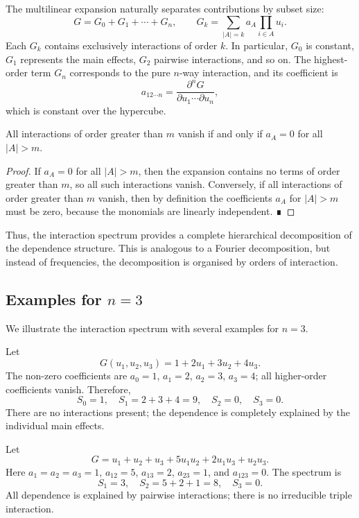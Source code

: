 The multilinear expansion naturally separates contributions by subset size:
\[
G = G_0 + G_1 + \cdots + G_n,\qquad G_k = \sum_{|A|=k} a_A \prod_{i\in A} u_i.
\]
Each \(G_k\) contains exclusively interactions of order \(k\). In particular, \(G_0\) is constant, \(G_1\) represents the main effects, \(G_2\) pairwise interactions, and so on. The highest-order term \(G_n\) corresponds to the pure \(n\)-way interaction, and its coefficient is
\[
a_{12\cdots n} = \frac{\partial^n G}{\partial u_1\cdots\partial u_n},
\]
which is constant over the hypercube.

\begin{theorem}
All interactions of order greater than \(m\) vanish if and only if \(a_A = 0\) for all \(|A| > m\).
\end{theorem}

\begin{proof}
If \(a_A = 0\) for all \(|A|>m\), then the expansion contains no terms of order greater than \(m\), so all such interactions vanish. Conversely, if all interactions of order greater than \(m\) vanish, then by definition the coefficients \(a_A\) for \(|A|>m\) must be zero, because the monomials are linearly independent. ∎
\end{proof}

Thus, the interaction spectrum provides a complete hierarchical decomposition of the dependence structure. This is analogous to a Fourier decomposition, but instead of frequencies, the decomposition is organised by orders of interaction.

\subsection{Examples for \(n=3\)}

We illustrate the interaction spectrum with several examples for \(n=3\).

\begin{example}
Let
\[
G(u_1,u_2,u_3) = 1 + 2u_1 + 3u_2 + 4u_3.
\]
The non-zero coefficients are \(a_0=1\), \(a_1=2\), \(a_2=3\), \(a_3=4\); all higher-order coefficients vanish. Therefore,
\[
S_0=1,\quad S_1=2+3+4=9,\quad S_2=0,\quad S_3=0.
\]
There are no interactions present; the dependence is completely explained by the individual main effects.
\end{example}

\begin{example}
Let
\[
G = u_1+u_2+u_3 + 5u_1u_2 + 2u_1u_3 + u_2u_3.
\]
Here \(a_1=a_2=a_3=1\), \(a_{12}=5\), \(a_{13}=2\), \(a_{23}=1\), and \(a_{123}=0\). The spectrum is
\[
S_1=3,\quad S_2=5+2+1=8,\quad S_3=0.
\]
All dependence is explained by pairwise interactions; there is no irreducible triple interaction.
\end{example}

